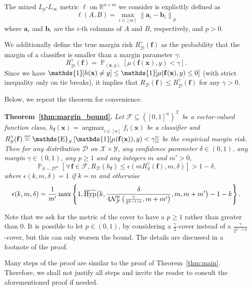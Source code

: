 \documentclass[twoside,11pt]{article}
\newcommand{\Id}[1]{\mathds{1}\hspace{-2.5pt}\left[#1\right]}
\let\oldforall=\forall
\renewcommand{\forall}{\hspace{1pt}\oldforall\hspace{1pt}}
\newcommand{\pr}[1]{\left(#1\right)}
\newcommand{\cb}[1]{\left\{#1\right\}}
\newcommand{\norm}[1]{\left\lVert#1\right\rVert}
\newcommand{\D}{\mathcal{D}}
\newcommand{\F}{\mathcal{F}}
\newcommand{\f}{\mathbf{f}}
\newcommand{\N}{\mathcal{N}}
\newcommand{\x}{\mathbf{x}}
\newcommand{\X}{\mathcal{X}}
\newcommand{\Y}{\mathcal{Y}}
\newcommand{\gammacover}{\frac{\gamma}{2^{2-1/p}}}
\newcommand{\reals}{\mathds{R}}
\newcommand{\eqdef}{\overset{\smash{\mbox{\tiny \rm def}}}{=}}
\DeclareMathOperator*{\Prob}{\mathds{P}}
\newcommand{\prob}[2]{\Prob_{#1}\left[#2\right]}
\DeclareMathOperator*{\Expectation}{\mathds{E}}
\newcommand{\exv}[2]{\Expectation_{#1}\left[#2\right]}
\DeclareMathOperator*{\argmax}{argmax}
\newcommand{\HypInv}{\overline{\textnormal{Hyp}}}
\begin{document}
The mixed $L_p$-$L_\infty$ metric $\ell$ on $\reals^{n \times m}$ we consider is explicitly defined as
\begin{equation*}
    \ell(A, B) = \max_{i \in [m]} \norm{\mathbf{a}_i - \mathbf{b}_i}_p
\end{equation*}
where $\mathbf{a}_i$ and $\mathbf{b}_i$ are the $i$-th columns of $A$ and $B$, respectively, and $p > 0$.

We additionally define the true margin risk $R^\gamma_\D(\f)$ as the probability that the margin of a classifier is smaller than a margin parameter $\gamma$:
\begin{equation}\label{eq:def_margin_risk}
    R^\gamma_\D(\f) = \prob{(\x,y)}{\mu(\f(\x), y) < \gamma}.
\end{equation}
Since we have $\Id{ h(\x) \neq y } \le \Id{ \mu(\f(\x), y) \le 0 }$ (with strict inequality only on tie breaks), it implies that $R_\D(\f) \le R^\gamma_\D(\f)$ for any $\gamma > 0$.

Below, we repeat the theorem for convenience.

{\noindent\bf Theorem~\ref{thm:margin_bound}.}
\textit{
Let $\F \subseteq ([0,1]^n)^\X$ be a vector-valued function class, $h_\f(\x) = \argmax_{i\in[n]} f_i(\x)$ be a classifier and $R^\gamma_S(\f) \eqdef \exv{S}{\Id{\mu(\f(\x)),y) < \gamma}}$ be the empirical margin risk.
Then for any distribution $\D$ on $\X \times \Y$, any confidence parameter $\delta \in (0, 1)$, any margin $\gamma \in (0,1)$, any $p\ge1$ and any integers $m$ and $m' > 0$,
\begin{equation*}
\prob{S\sim \D^m}{ \forall \f \in \F, R_\D(h_\f) \leq \epsilon(m R^\gamma_S(\f), m, \delta) } > 1 - \delta,
\end{equation*}
where $\epsilon(k,m,\delta) = 1$ if $k=m$ and otherwise
\begin{equation*}
\epsilon(k, m, \delta) = \frac{1}{m'} \max\cb{ 1, \HypInv\big(k, \frac{\delta}{4 \N^p_\F\pr{\frac{\gamma}{2^{2 - 1/p}}, m + m'}}, m, m + m'\big) - 1 - k }.
\end{equation*}
}

Note that we ask for the metric of the cover to have a $p \ge 1$ rather than greater than 0.
It is possible to let $p \in (0,1)$, by considering a $\frac{\gamma}{2}$-cover instead of a $\gammacover$-cover, but this can only worsen the bound.
The details are discussed in a footnote of the proof.

Many steps of the proof are similar to the proof of Theorem~\ref{thm:main}.
Therefore, we shall not justify all steps and invite the reader to consult the aforementioned proof if needed.
\end{document}
